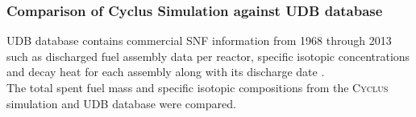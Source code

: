 \begin{frame}
    \frametitle{Comparison of Cyclus Simulation against UDB database}
        UDB database contains commercial SNF information from 1968 through 2013 such as 
        discharged fuel assembly data per reactor, specific isotopic concentrations and 
        decay heat for each assembly along with its discharge date \cite{peterson_unf_2017}. 
        \\ 
        
        The total spent fuel mass and specific isotopic compositions from the \textsc{Cyclus} 
        simulation and UDB database were compared. 
  \end{frame}
  